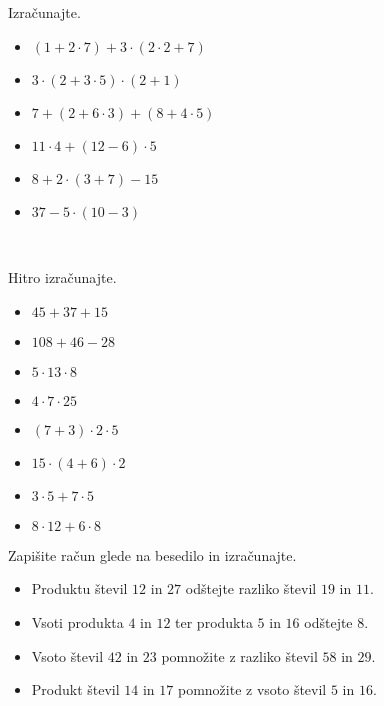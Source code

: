 \begin{multicols}{2}
    
 
     \begin{naloga}
        Izračunajte.
        \begin{itemize}
            \item $(1+2\cdot 7)+3\cdot(2\cdot 2+7)$ 
            \item $3\cdot(2+3\cdot 5)\cdot(2+1)$ 
            \item $7+(2+6\cdot 3)+(8+4\cdot 5)$ 
            \item $11\cdot 4+(12-6)\cdot 5$ 
            \item $8+2\cdot(3+7)-15$ 
            \item $37-5\cdot(10-3)$ 
        \end{itemize}
     \end{naloga}
 
~\\
 
     \begin{naloga}
        Hitro izračunajte.
        \begin{itemize}
            \item $45+37+15$ 
            \item $108+46-28$
            \item $5\cdot 13\cdot 8$
            \item $4\cdot 7\cdot 25$
            \item $(7+3)\cdot 2\cdot 5$
            \item $15\cdot(4+6)\cdot 2$
            \item $3\cdot 5+7\cdot 5$
            \item $8\cdot 12+6\cdot 8$
        \end{itemize}
     \end{naloga}
 
\end{multicols}
 
     \begin{naloga}
        Zapišite račun glede na besedilo in izračunajte.
        \begin{itemize}
            \item Produktu števil $12$ in $27$ odštejte razliko števil $19$ in $11$. 
            \item Vsoti produkta $4$ in $12$ ter produkta $5$ in $16$ odštejte $8$. 
            \item Vsoto števil $42$ in $23$ pomnožite z razliko števil $58$ in $29$. 
            \item Produkt števil $14$ in $17$ pomnožite z vsoto števil $5$ in $16$. 
        \end{itemize}
     \end{naloga}
 

